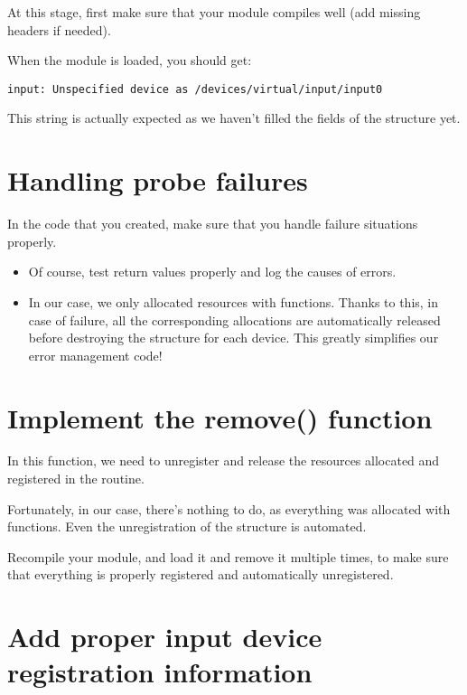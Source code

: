 At this stage, first make sure that your module compiles well (add
missing headers if needed).

When the module is loaded, you should get:
\begin{verbatim}
input: Unspecified device as /devices/virtual/input/input0
\end{verbatim}

This  string is actually expected
as we haven't filled the fields of the  structure yet.

\section{Handling probe failures}

In the code that you created, make sure that you handle failure
situations properly.

\begin{itemize}
\item Of course, test return values properly and log
      the causes of errors.
\item In our case, we only allocated resources with 
      functions. Thanks to this, in case of failure, all the
      corresponding allocations are automatically released
      before destroying the  structure for each
      device. This greatly simplifies our error management code!
\end{itemize}

\section{Implement the remove() function}

In this function, we need to unregister and release the resources allocated
and registered in the  routine.

Fortunately, in our case, there's nothing to do, as everything
was allocated with  functions. Even the unregistration
of the  structure is automated. 

Recompile your module, and load it and remove it multiple times, to
make sure that everything is properly registered and automatically
unregistered.

\section{Add proper input device registration information}

